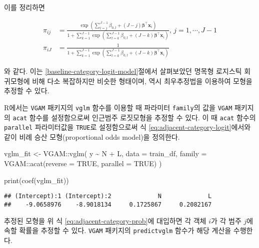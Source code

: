 \documentclass[
]{book}
\newenvironment{Shaded}{\begin{snugshade}}{\end{snugshade}}
\newcommand{\AttributeTok}[1]{\textcolor[rgb]{0.77,0.63,0.00}{#1}}
\newcommand{\ConstantTok}[1]{\textcolor[rgb]{0.00,0.00,0.00}{#1}}
\newcommand{\FunctionTok}[1]{\textcolor[rgb]{0.00,0.00,0.00}{#1}}
\newcommand{\NormalTok}[1]{#1}
\newcommand{\OtherTok}[1]{\textcolor[rgb]{0.56,0.35,0.01}{#1}}
\newcommand{\SpecialCharTok}[1]{\textcolor[rgb]{0.00,0.00,0.00}{#1}}
\begin{document}
이를 정리하면

\begin{equation}
\begin{split}
\pi_{ij} &= \frac{\exp \left( \sum_{l = j}^{J - 1} \beta_{0,l} + (J - j) \boldsymbol\beta^\top \mathbf{x}_i \right)}{1 + \sum_{k = 1}^{J - 1} \exp \left( \sum_{l = k}^{J - 1} \beta_{0,l} + (J - k) \boldsymbol\beta^\top \mathbf{x}_i \right)}, \, j = 1, \cdots, J - 1\\
\pi_{iJ} &= \frac{1}{1 + \sum_{k = 1}^{J - 1} \exp \left( \sum_{l = k}^{J - 1} \beta_{0,l} + (J - k) \boldsymbol\beta^\top \mathbf{x}_i \right)}
\end{split}
\label{eq:adjacent-category-prob}
\end{equation}

와 같다. 이는 \ref{baseline-category-logit-model}절에서 살펴보았던 명목형 로지스틱 회귀모형에 비해 다소 복잡하지만 비슷한 형태이며, 역시 최우추정법을 이용하여 모형을 추정할 수 있다.

R에서는 \texttt{VGAM} 패키지의 \texttt{vglm} 함수를 이용할 때 파라미터 \texttt{family}의 값을 \texttt{VGAM} 패키지의 \texttt{acat} 함수를 설정함으로써 인근범주 로짓모형을 추정할 수 있다. 이 때 \texttt{acat} 함수의 \texttt{parallel} 파라미터값을 \texttt{TRUE}로 설정함으로써 식 \eqref{eq:adjacent-category-logit}에서와 같이 비례 승산 모형(proportional odds model)을 정의한다.

\begin{Shaded}
\begin{Highlighting}[]
\NormalTok{vglm\_fit }\OtherTok{\textless{}{-}}\NormalTok{ VGAM}\SpecialCharTok{::}\FunctionTok{vglm}\NormalTok{(}
\NormalTok{  y }\SpecialCharTok{\textasciitilde{}}\NormalTok{ N }\SpecialCharTok{+}\NormalTok{ L,}
  \AttributeTok{data =}\NormalTok{ train\_df,}
  \AttributeTok{family =}\NormalTok{ VGAM}\SpecialCharTok{::}\FunctionTok{acat}\NormalTok{(}\AttributeTok{reverse =} \ConstantTok{TRUE}\NormalTok{, }\AttributeTok{parallel =} \ConstantTok{TRUE}\NormalTok{)}
\NormalTok{  )}

\FunctionTok{print}\NormalTok{(}\FunctionTok{coef}\NormalTok{(vglm\_fit))}
\end{Highlighting}
\end{Shaded}

\begin{verbatim}
## (Intercept):1 (Intercept):2             N             L 
##    -9.0658976    -8.9018134     0.1725867     0.2082167
\end{verbatim}

추정된 모형을 위 식 \eqref{eq:adjacent-category-prob}에 대입하면 각 객체 \(i\)가 각 범주 \(j\)에 속할 확률을 추정할 수 있다. \texttt{VGAM} 패키지의 \texttt{predictvglm} 함수가 해당 계산을 수행한다.
\end{document}
